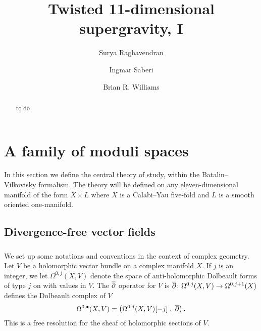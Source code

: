 \documentclass[11pt]{amsart}
\begin{document}
\title{Twisted 11-dimensional supergravity, I}
\author{Surya Raghavendran}
\address{Perimeter Institute for Theoretical Physics \\ 31 Caroline Street North \\ 
Waterloo, Ontario N2L 2Y5\\ Canada}
\author{Ingmar Saberi}
\address{Ludwig-Maximilians-Universit\"at M\"unchen \\ Fakult\"at f\"ur Physik \\ Theresienstra\ss{}e 37 \\ 80333 M\"unchen \\ Deutschland}
\author{Brian R. Williams}
\address{School of Mathematics \\ University of Edinburgh \\ Edinburgh EH9 3FD \\ Scotland}
\begin{abstract}
to do
\end{abstract}
\maketitle

\newpage 

\section{A family of moduli spaces} 
\label{s:dfn}

In this section we define the central theory of study, within the Batalin--Vilkovisky formalism.
The theory will be defined on any eleven-dimensional manifold of the form $X \times L$ where $X$ is a Calabi--Yau five-fold and $L$ is a smooth oriented one-manifold.

\subsection{Divergence-free vector fields} 

\subsubsection{}
\label{sec:divfree}
We set up some notations and conventions in the context of complex geometry. 
Let $V$ be a holomorphic vector bundle on a complex manifold $X$. 
If $j$ is an integer, we let $\Omega^{0,j}(X, V)$ denote the space of anti-holomorphic Dolbeault forms of type $j$ on with values in $V$.
The $\overline{\partial}$ operator for $V$ is $\overline{\partial} \colon \Omega^{0,j}(X, V)\to \Omega^{0,j+1}(X)$ defines the Dolbeault complex of $V$
\[
  \Omega^{0,\bullet}(X, V) = \left(\Omega^{0,j}(X, V)[-j] \; , \; \overline{\partial}\right) .
\]
This is a free resolution for the sheaf of holomorphic sections of $V$.
\end{document}
